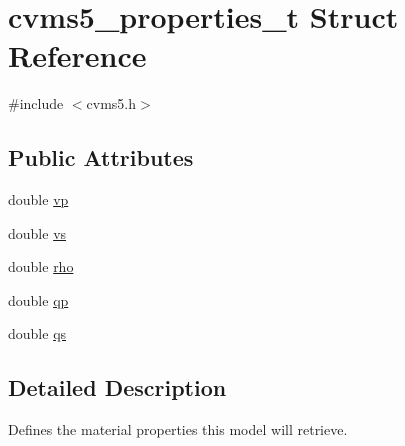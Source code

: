 \hypertarget{structcvms5__properties__t}{\section{cvms5\+\_\+properties\+\_\+t Struct Reference}
\label{structcvms5__properties__t}
}


{\ttfamily \#include $<$cvms5.\+h$>$}

\subsection*{Public Attributes}
\begin{DoxyCompactItemize}
\item 
double \hyperlink{structcvms5__properties__t_acb095810eaf9bcc23e4c66de57c31a1d}{vp}
\item 
double \hyperlink{structcvms5__properties__t_a2f479c09fbbb41f531de68ca4c354c32}{vs}
\item 
double \hyperlink{structcvms5__properties__t_a6d5e01c69dc8c6d01d83b80be8cd6fa6}{rho}
\item 
double \hyperlink{structcvms5__properties__t_ac6e2000ffa6cd393a352390e16808afb}{qp}
\item 
double \hyperlink{structcvms5__properties__t_a6a0eff66f0e8ac953db5c97243054ac7}{qs}
\end{DoxyCompactItemize}


\subsection{Detailed Description}
Defines the material properties this model will retrieve. 

